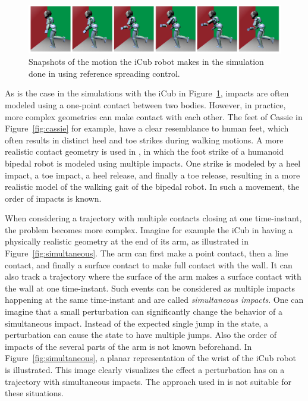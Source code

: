 \documentclass[../DC2017114Bouma.tex]{subfiles}
\begin{document}
\begin{figure}[bt!]
\centering
\includegraphics[width=\textwidth]{rijnen2017.PNG}\caption{Snapshots of the motion the iCub robot makes in the simulation done in \cite{Rijnen2017a} using reference spreading control.}\label{fig:rijnen2017}
\end{figure}

As is the case in the simulations with the iCub in Figure~\ref{fig:rijnen2017}, impacts are often modeled using a one-point contact between two bodies. However, in practice, more complex geometries can make contact with each other. The feet of Cassie in Figure~\ref{fig:cassie} for example, have a clear resemblance to human feet, which often results in distinct heel and toe strikes during walking motions. A more realistic contact geometry is used in \cite{Zhao2015}, in which the foot strike of a humanoid bipedal robot is modeled using multiple impacts. One strike is modeled by a heel impact, a toe impact, a heel release, and finally a toe release, resulting in a more realistic model of the walking gait of the bipedal robot. In such a movement, the order of impacts is known.

When considering a trajectory with multiple contacts closing at one time-instant, the problem becomes more complex. Imagine for example the iCub in \cite{Rijnen2017a} having a physically realistic geometry at the end of its arm, as illustrated in Figure~\ref{fig:simultaneous}. The arm can first make a point contact, then a line contact, and finally a surface contact to make full contact with the wall. It can also track a trajectory where the surface of the arm makes a surface contact with the wall at one time-instant. Such events can be considered as multiple impacts happening at the same time-instant and are called \textit{simultaneous impacts}. One can imagine that a small perturbation can significantly change the behavior of a simultaneous impact. Instead of the expected single jump in the state, a perturbation can cause the state to have multiple jumps. Also the order of impacts of the several parts of the arm is not known beforehand. In Figure~\ref{fig:simultaneous}, a planar representation of the wrist of the iCub robot is illustrated. This image clearly visualizes the effect a perturbation has on a trajectory with simultaneous impacts. The approach used in \cite{Zhao2015} is not suitable for these situations.
\end{document}
